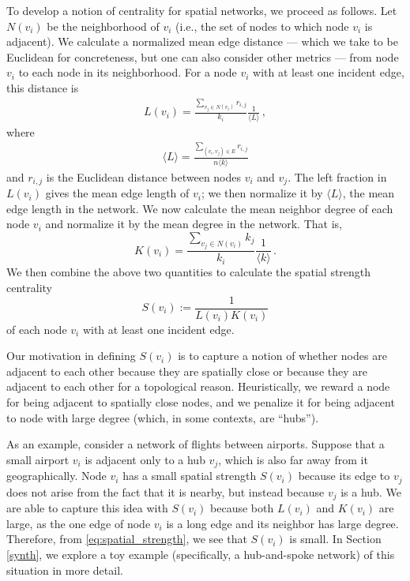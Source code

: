 \documentclass[%
 reprint,
 amsmath,amssymb,
 aps,
]{revtex4-1}
\begin{document}
To develop a notion of centrality for spatial networks, we proceed as follows. Let $N(v_i)$ be the neighborhood of $v_i$ (i.e., the set of nodes to which node $v_i$ is adjacent). We calculate a normalized mean edge distance --- which we take to be Euclidean for concreteness, but one can also consider other metrics --- from node $v_i$ to each node in its neighborhood. For a node $v_i$ with at least one incident edge, this distance is
\begin{align}
    L(v_i) = \frac{\sum_{v_j \in N(v_i)}r_{i,j}}{k_i} \frac{1}{{\langle L \rangle}}\,,
\label{eq:v_edge_length}
\end{align}
where
\begin{align}
    \langle L \rangle = \frac{\sum_{(v_i, v_j) \in E}r_{i,j}}{n \langle k \rangle}
\end{align}
and $r_{i,j}$ is the Euclidean distance between nodes $v_i$ and $v_j$. The left fraction in $L(v_i)$ gives the mean edge length of $v_i$; we then normalize it by $\langle L \rangle$, the mean edge length in the network. We now calculate the mean neighbor degree of each node $v_i$ and normalize it by the mean degree in the network. That is,
\begin{equation}
    K(v_i) = \frac{\sum_{v_j \in N(v_i)} k_j}{k_i} \frac{1}{\langle k \rangle}\,.
\end{equation}
We then combine the above two quantities to calculate the spatial strength centrality
\begin{equation} \label{eq:spatial_strength}
    S(v_i) := \frac{1}{L(v_i)K(v_i)}
\end{equation}
of each node $v_i$ with at least one incident edge.

Our motivation in defining $S(v_i)$ is to capture a notion of whether nodes are adjacent to each other because they are spatially close or because they are adjacent to each other for a topological reason. Heuristically, we reward a node for being adjacent to spatially close nodes, and we penalize it for being adjacent to node with large degree (which, in some contexts, are ``hubs'').

As an example, consider a network of flights between airports. Suppose that a small airport $v_i$ is adjacent only to a hub $v_j$, which is also far away from it geographically. Node $v_i$ has a small spatial strength $S(v_i)$ because its edge to $v_j$ does not arise from the fact that it is nearby, but instead because $v_j$ is a hub. We are able to capture this idea with $S(v_i)$ because both $L(v_i)$ and $K(v_i)$ are large, as the one edge of node $v_i$ is a long edge and its neighbor has large degree. Therefore, from \eqref{eq:spatial_strength}, we see that $S(v_i)$ is small. In Section \ref{synth}, we explore a toy example (specifically, a hub-and-spoke network)
of this situation in more detail.
\end{document}
